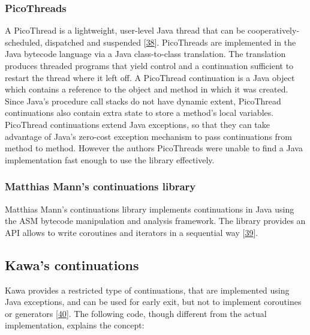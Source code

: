 \documentclass[12pt,a4paper,oneside,openright]{book}
\begin{document}
\subsubsection{PicoThreads}\label{picothreads}

A PicoThread is a lightweight, user-level Java thread that can be
cooperatively-scheduled, dispatched and suspended
{[}\hyperref[ref-begel2000picothreads]{38}{]}. PicoThreads are
implemented in the Java bytecode language via a Java class-to-class
translation. The translation produces threaded programs that yield
control and a continuation sufficient to restart the thread where it
left off. A PicoThread continuation is a Java object which contains a
reference to the object and method in which it was created. Since Java's
procedure call stacks do not have dynamic extent, PicoThread
continuations also contain extra state to store a method's local
variables. PicoThread continuations extend Java exceptions, so that they
can take advantage of Java's zero-cost exception mechanism to pass
continuations from method to method. However the authors PicoThreads
were unable to find a Java implementation fast enough to use the library
effectively.

\subsubsection{Matthias Mann's continuations
library}\label{matthias-manns-continuations-library}

Matthias Mann's continuations library implements continuations in Java
using the ASM bytecode manipulation and analysis framework. The library
provides an API allows to write coroutines and iterators in a sequential
way {[}\hyperref[ref-ContinuationsLib2015]{39}{]}.

\subsection{Kawa's continuations}\label{kawas-continuations}

Kawa provides a restricted type of continuations, that are implemented
using Java exceptions, and can be used for early exit, but not to
implement coroutines or generators {[}\hyperref[ref-Bothner1998]{40}{]}.
The following code, though different from the actual implementation,
explains the concept:
\end{document}
